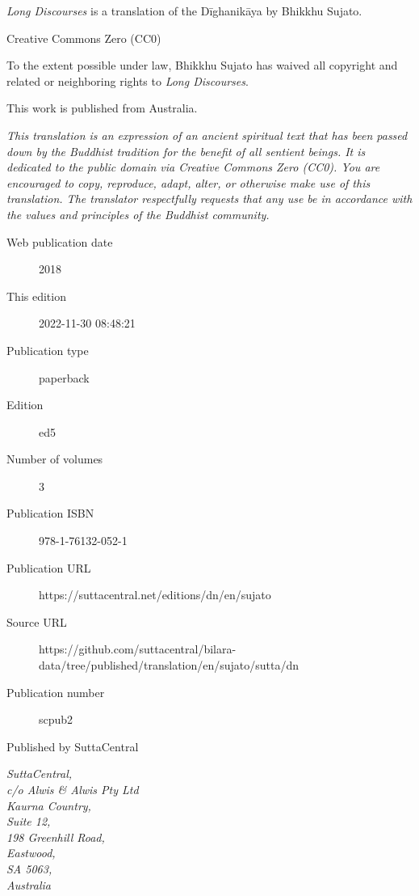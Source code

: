 \documentclass[12pt,openany]{book}%
\begin{document}
\begin{footnotesize}

\textit{Long Discourses} is a translation of the Dīghanikāya by Bhikkhu Sujato.

\medskip

Creative Commons Zero (CC0)

To the extent possible under law, Bhikkhu Sujato has waived all copyright and related or neighboring rights to \textit{Long Discourses}.

\medskip

This work is published from Australia.

\begin{center}
\textit{This translation is an expression of an ancient spiritual text that has been passed down by the Buddhist tradition for the benefit of all sentient beings. It is dedicated to the public domain via Creative Commons Zero (CC0). You are encouraged to copy, reproduce, adapt, alter, or otherwise make use of this translation. The translator respectfully requests that any use be in accordance with the values and principles of the Buddhist community.}
\end{center}

\medskip

\begin{description}
    \item[Web publication date] 2018
    \item[This edition] 2022-11-30 08:48:21
    \item[Publication type] paperback
    \item[Edition] ed5
    \item[Number of volumes] 3
    \item[Publication ISBN] 978-1-76132-052-1
    \item[Publication URL] https://suttacentral.net/editions/dn/en/sujato
    \item[Source URL] https://github.com/suttacentral/bilara-data/tree/published/translation/en/sujato/sutta/dn
    \item[Publication number] scpub2
\end{description}

\medskip

Published by SuttaCentral

\medskip

\textit{SuttaCentral,\\
c/o Alwis \& Alwis Pty Ltd\\
Kaurna Country,\\
Suite 12,\\
198 Greenhill Road,\\
Eastwood,\\
SA 5063,\\
Australia}

\end{footnotesize}
\end{document}
